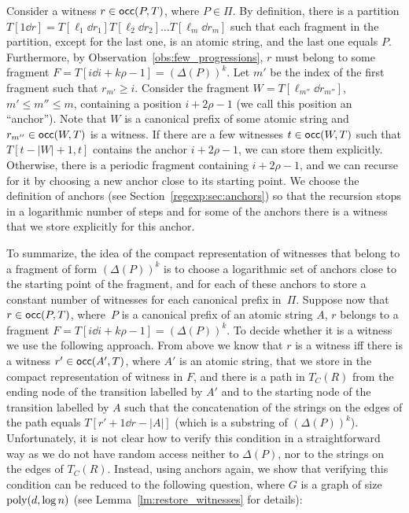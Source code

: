 Consider a witness $r \in \mathsf{occ}(P, T)$, where $P \in \Pi$. By definition, there is a partition $T[1\dd r] = T[\ell_1\dd r_1] T[\ell_2 \dd r_2] \ldots T[\ell_m \dd r_m]$ such that each fragment in the partition, except for the last one, is an atomic string, and the last one equals $P$. Furthermore, by Observation~\ref{obs:few_progressions}, $r$ must belong to some fragment $F = T[i \dd i + k \rho -1] = (\Delta(P))^k$. Let $m'$ be the index of the first fragment such that $r_{m'} \ge i$. Consider the fragment $W = T[\ell_{m''} \dd r_{m''}]$, $m' \le m'' \le m$, containing a position $i+2\rho-1$ (we call this position an ``anchor''). Note that $W$  is a canonical prefix of some atomic string and $r_{m''} \in \mathsf{occ}(W, T)$ is a witness. If there are a few witnesses $t \in \mathsf{occ}(W, T)$ such that $T[t-|W|+1,t]$ contains the anchor $i+2\rho-1$, we can store them explicitly. Otherwise, there is a periodic fragment containing $i+2\rho-1$, and we can recurse for it by choosing a new anchor close to its starting point. We choose the definition of anchors (see Section~\ref{regexp:sec:anchors}) so that the recursion stops in a logarithmic number of steps and for some of the anchors there is a witness that we store explicitly for this anchor. 

To summarize, the idea of the compact representation of witnesses that belong to a fragment of form $(\Delta(P))^k$ is to choose a logarithmic set of anchors close to the starting point of the fragment, and for each of these anchors to store a constant number of witnesses for each canonical prefix in~$\Pi$.  Suppose now that $r \in \mathsf{occ}(P,T)$, where~$P$ is a canonical prefix of an atomic string $A$, $r$ belongs to a fragment $F = T[i \dd i + k \rho -1] = (\Delta(P))^k$. To decide whether it is a witness we use the following approach. From above we know that $r$ is a witness iff there is a witness $r' \in \mathsf{occ}(A',T)$, where $A'$ is an atomic string, that we store in the compact representation of witness in $F$, and there is a path in $T_C(R)$ from the ending node of the transition labelled by $A'$ and to the starting node of the transition labelled by $A$ such that the concatenation of the strings on the edges of the path equals $T[r'+1\dd r-|A|]$ (which is a substring of $(\Delta(P))^k$). Unfortunately, it is not clear how to verify this condition in a straightforward way as we do not have random access neither to $\Delta(P)$, nor to the strings on the edges of $T_C(R)$. Instead, using anchors again, we show that verifying this condition can be reduced to the following question, where $G$ is a graph of size $\mathrm{poly}(d, \log n)$ (see Lemma~\ref{lm:restore_witnesses} for details):

